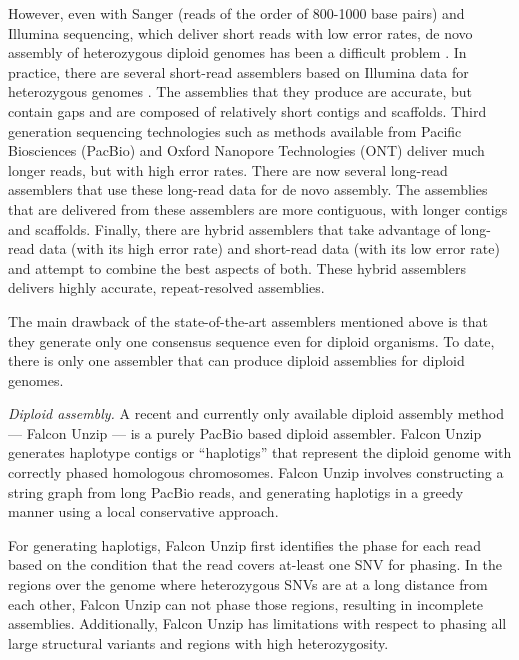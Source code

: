 However, even with Sanger (reads of the order of 800-1000 base pairs) and Illumina sequencing, which deliver short reads with low error rates, de novo assembly of heterozygous diploid genomes has been a difficult problem \citep{vinson2005assembly, levy2007diploid}.
In practice, there are several short-read assemblers based on Illumina data for heterozygous genomes \citep{kajitani2014efficient, pryszcz2016redundans, simpson2012efficient, bankevich2012spades, li2015fermikit}.
The assemblies that they produce are accurate, but contain gaps and are composed of relatively short contigs and scaffolds. 
Third generation sequencing technologies such as methods available from Pacific Biosciences (PacBio) and Oxford Nanopore Technologies (ONT) deliver much longer reads, but with high error rates.
There are now several long-read assemblers \citep{koren2017canu, vaser2017fast, xiao2016mecat, berlin2015assembling, chin2013nonhybrid, hunt2015circlator, lin2016assembly} that use these long-read data for de novo assembly.
The assemblies that are delivered from these assemblers are more contiguous, with longer contigs and scaffolds.
Finally, there are hybrid assemblers that take advantage of long-read data (with its high error rate) and short-read data (with its low error rate) \citep{bashir2012hybrid, antipov2015hybridspades, zimin2017hybrid} and attempt to combine the best aspects of both.
These hybrid assemblers delivers highly accurate, repeat-resolved assemblies.

The main drawback of the state-of-the-art assemblers mentioned above is that they generate only one consensus sequence even for diploid organisms. To date, there is only one assembler that can produce diploid assemblies for diploid genomes.

\textit{Diploid assembly.} A recent and currently only available diploid assembly method --- Falcon Unzip \citep{chin2016phased} --- is a purely PacBio based diploid assembler.
Falcon Unzip generates haplotype contigs or ``haplotigs'' that represent the diploid genome with correctly phased homologous chromosomes.
Falcon Unzip involves constructing a string graph from long PacBio reads, and generating haplotigs in a greedy manner using a local conservative approach.


For generating haplotigs, Falcon Unzip first identifies the phase for each read based on the condition that the read covers at-least one SNV for phasing.
In the regions over the genome where heterozygous SNVs are at a long distance from each other, Falcon Unzip can not phase those regions, resulting in incomplete assemblies.
Additionally, Falcon Unzip has limitations with respect to phasing all large structural variants and regions with high heterozygosity. 

